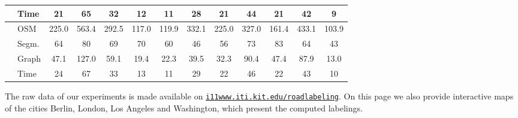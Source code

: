 \documentclass[a4paper,11pt]{article}
\begin{document}
\begin{table}[t]
\begin{tabular}{llccccccccccc}
&Time & 21 & 65 & 32 & 12 & 11 & 28 & 21 & 44 & 21 & 42 & 9\\
\midrule
\parbox[t]{3mm}{}
&OSM & 225.0 & 563.4 & 292.5 & 117.0 & 119.9 & 332.1 & 225.0 & 327.0 & 161.4 & 433.1 & 103.9\\
&Segm. & 64 & 80 & 69 & 70 & 60 & 46 & 56 & 73 & 83 & 64 & 43\\
&Graph & 47.1 & 127.0 & 59.1 & 19.4 & 22.3 & 39.5 & 32.3 & 90.4 & 47.4 & 87.9 & 13.0\\
&Time & 24 & 67 & 33 & 13 & 11 & 29 & 22 & 46 & 22 & 43 & 10\\
\bottomrule
\end{tabular}
\end{table}

The raw data of our experiments is made available on
\href{http://i11www.iti.kit.edu/roadlabeling}{\texttt{i11www.iti.kit.edu/roadlabeling}}. On this page we also
provide interactive maps of the cities Berlin, London, Los Angeles and
Washington, which present the computed labelings. 
\end{document}
